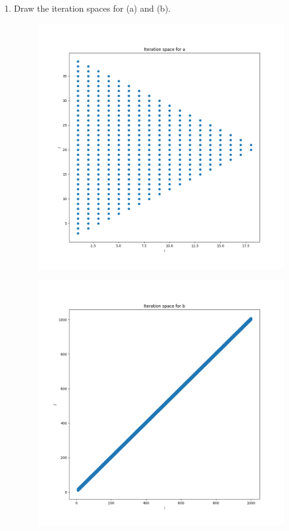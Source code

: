\documentclass[11pt]{article}
\begin{document}
\begin{enumerate}
	\item Draw the iteration spaces for (a) and (b).
	      \begin{Answer}
		      \begin{figure}[H]
			      \centerline{\includegraphics[width=6in]{figures/iteration_space_a.png}}
		      \end{figure}
		      \begin{figure}[H]
			      \centerline{\includegraphics[width=6in]{figures/iteration_space_b.png}}

\end{figure}
\end{Answer}
\end{enumerate}
\end{document}
